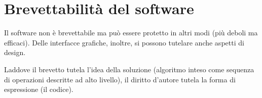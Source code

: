 \section{Brevettabilità del software}

Il software non è brevettabile ma può essere protetto in altri modi (più deboli ma efficaci). Delle interfacce grafiche, inoltre, si possono tutelare anche aspetti di design. 

Laddove il brevetto tutela l'idea della soluzione (algoritmo inteso come sequenza di operazioni descritte ad alto livello), il diritto d'autore tutela la forma di espressione (il codice).

